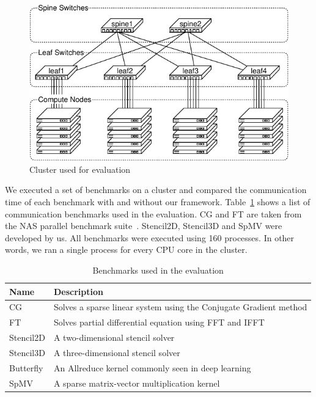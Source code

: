\documentclass[graybox]{svmult}
\begin{document}
\begin{figure}
    \centering
    \includegraphics{evaluation_cluster}
    \caption{Cluster used for evaluation}%
    \label{kt:fig:cluster}
\end{figure}

We executed a set of benchmarks on a cluster and compared the communication
time of each benchmark with and without our framework.
Table~\ref{kt:tbl:miniapps} shows a list of communication benchmarks used in
the evaluation. CG and FT are taken from the NAS parallel benchmark
suite~\cite{Bailey1991}. Stencil2D, Stencil3D and SpMV were developed by us.
All benchmarks were executed using 160 processes. In other words, we ran a
single process for every CPU core in the cluster.

\begin{table}
\caption{Benchmarks used in the evaluation}%
\label{kt:tbl:miniapps}
\begin{tabular}{ll}
\toprule
Name      & Description \\ \midrule
CG        & Solves a sparse linear system using the Conjugate Gradient method \\
FT        & Solves partial differential equation using FFT and IFFT           \\
Stencil2D & A two-dimensional stencil solver                                  \\
Stencil3D & A three-dimensional stencil solver                                \\
Butterfly & An Allreduce kernel commonly seen in deep learning                \\
SpMV      & A sparse matrix-vector multiplication kernel                      \\ \bottomrule
\end{tabular}
\end{table}
\end{document}
